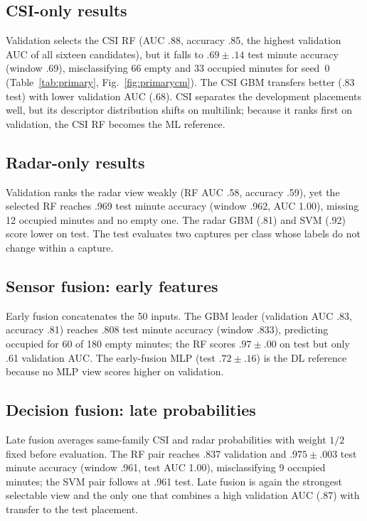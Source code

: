 \documentclass[conference,10pt,letterpaper]{IEEEtran}
\begin{document}
\subsection{CSI-only results}
Validation selects the CSI RF (AUC .88, accuracy .85, the highest validation AUC of all sixteen candidates), but it falls to $.69\pm.14$ test minute accuracy (window .69), misclassifying 66 empty and 33 occupied minutes for seed~0 (Table~\ref{tab:primary}, Fig.~\ref{fig:primarycm}). The CSI GBM transfers better (.83 test) with lower validation AUC (.68). CSI separates the development placements well, but its descriptor distribution shifts on multilink; because it ranks first on validation, the CSI RF becomes the ML reference.

\subsection{Radar-only results}
Validation ranks the radar view weakly (RF AUC .58, accuracy .59), yet the selected RF reaches .969 test minute accuracy (window .962, AUC 1.00), missing 12 occupied minutes and no empty one. The radar GBM (.81) and SVM (.92) score lower on test. The test evaluates two captures per class whose labels do not change within a capture.

\subsection{Sensor fusion: early features}
Early fusion concatenates the 50 inputs. The GBM leader (validation AUC .83, accuracy .81) reaches .808 test minute accuracy (window .833), predicting occupied for 60 of 180 empty minutes; the RF scores $.97\pm.00$ on test but only .61 validation AUC. The early-fusion MLP (test $.72\pm.16$) is the DL reference because no MLP view scores higher on validation.

\subsection{Decision fusion: late probabilities}
Late fusion averages same-family CSI and radar probabilities with weight $1/2$ fixed before evaluation. The RF pair reaches .837 validation and $.975\pm.003$ test minute accuracy (window .961, test AUC 1.00), misclassifying 9 occupied minutes; the SVM pair follows at .961 test. Late fusion is again the strongest selectable view and the only one that combines a high validation AUC (.87) with transfer to the test placement.
\end{document}
